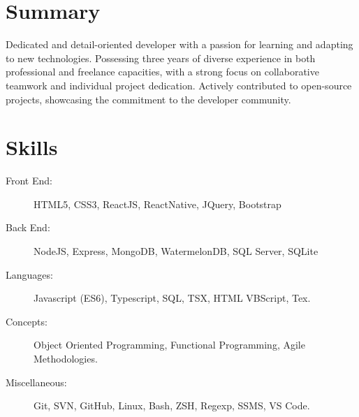 \documentclass[a4paper,10pt]{article}
\begin{document}

\fancyhead[C]{
}


\section{Summary}
\sloppy
Dedicated and detail-oriented developer with a passion for learning and
adapting to new technologies. Possessing three years of diverse experience in both professional and freelance capacities,
with a strong focus on collaborative teamwork and individual project dedication.
Actively contributed to open-source projects, showcasing the commitment to the developer community.

\section{Skills}

\begin{description}
    \item[Front End:] HTML5, CSS3, ReactJS, ReactNative, JQuery, Bootstrap
    \item[Back End:] NodeJS, Express, MongoDB, WatermelonDB, SQL Server, SQLite
    \item[Languages:] Javascript (ES6), Typescript, SQL, TSX, HTML VBScript, Tex.
    \item[Concepts:] Object Oriented Programming, Functional Programming, Agile Methodologies.
    \item[Miscellaneous:] Git, SVN, GitHub, Linux, Bash, ZSH, Regexp, SSMS, VS Code.
\end{description}
\end{document}
